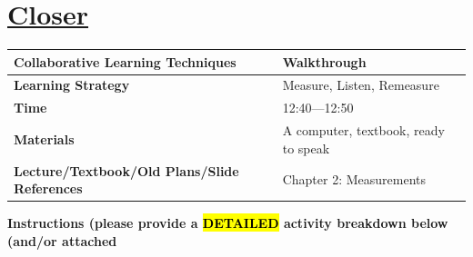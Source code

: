 \documentclass{article}
\begin{document}
\newpage
\noindent
\section*{\underline{Closer}}
\begin{tabular}{|p{4.2cm}|p{9.8cm}|}
\hline
\textbf{Collaborative Learning Techniques} & Walkthrough \\
\hline
\textbf{Learning Strategy} & Measure, Listen, Remeasure \\
\hline
\textbf{Time} & 12:40---12:50 \\
\hline
\textbf{Materials} & A computer, textbook, ready to speak \\
\hline
\textbf{Lecture/Textbook/Old Plans/Slide References} &  Chapter 2: Measurements \\
\hline
\end{tabular}

\vspace{0.5cm}
\noindent
{\large \textbf{Instructions (please provide a \hl{DETAILED} activity breakdown below (and/or attached}} \\[0.2em]
\end{document}
